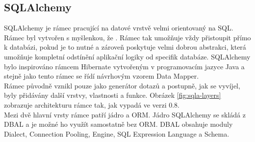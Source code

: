 \documentclass[ing,male,java,dept456]{diploma}						%
\begin{document}
\subsection{SQLAlchemy}

SQLAlchemy je rámec pracující na datové vrstvě velmi orientovaný na SQL. Rámec byl vytvořen s myšlenkou, že \cite{wiki-sqla}. Rámec tak umožňuje vždy přistoupit přímo k databázi, pokud je to nutné a zároveň poskytuje velmi dobrou abstrakci, která umožňuje kompletní odstínění aplikační logiky od specifik databáze. SQLAlchemy bylo inspirováno rámcem Hibernate vytvořeným v programovacím jazyce Java a stejně jako tento rámec se řídí návrhovým vzorem Data Mapper. \\ 
Rámec původně vznikl pouze jako generátor dotazů a postupně, jak se vyvíjel, byly přidávány další vrstvy, vlastnosti a funkce. Obrázek \ref{fig:sqla-layers} zobrazuje architekturu rámce tak, jak vypadá ve verzi 0.8. \\ Mezi dvě hlavní vrsty rámce patří jádro a ORM. Jádro SQLAlchemy se skládá z DBAL a je možné ho využít samostatně bez ORM. DBAL obsahuje moduly Dialect, Connection Pooling, Engine, SQL Expression Language a Schema.
\end{document}
